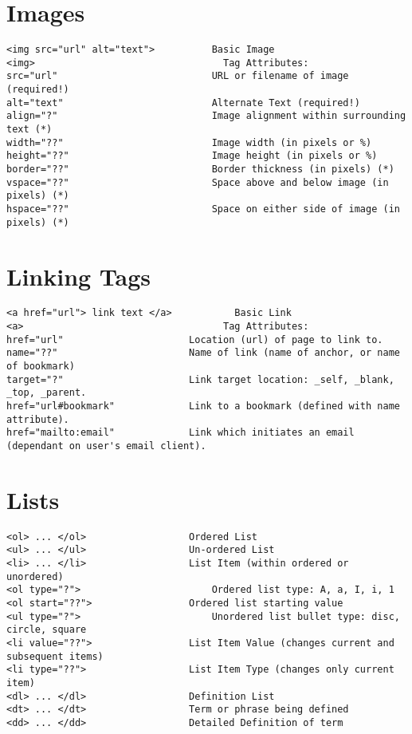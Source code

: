 \documentclass[11pt]{article}
\begin{document}
\section*{Images}
\label{sec:orgeabbfb8}
\begin{verbatim}
<img src="url" alt="text"> 	        Basic Image
<img>                                 Tag Attributes:	 
src="url"	                        URL or filename of image (required!)
alt="text"	                        Alternate Text (required!)
align="?"	                        Image alignment within surrounding text (*)
width="??"	                        Image width (in pixels or %)
height="??"	                        Image height (in pixels or %)
border="??"	                        Border thickness (in pixels) (*)
vspace="??"	                        Space above and below image (in pixels) (*)
hspace="??"	                        Space on either side of image (in pixels) (*)
\end{verbatim}
\section*{Linking Tags}
\label{sec:org6681346}
\begin{verbatim}
<a href="url"> link text </a>	        Basic Link
<a>                                   Tag Attributes:	 
href="url"		                Location (url) of page to link to.
name="??"		                Name of link (name of anchor, or name of bookmark)
target="?"		                Link target location: _self, _blank, _top, _parent.
href="url#bookmark"		        Link to a bookmark (defined with name attribute).
href="mailto:email"		        Link which initiates an email (dependant on user's email client).
\end{verbatim}
\section*{Lists}
\label{sec:orga93986d}
\begin{verbatim}
<ol> ... </ol>	                Ordered List
<ul> ... </ul>	                Un-ordered List
<li> ... </li>	                List Item (within ordered or unordered)
<ol type="?">		                Ordered list type: A, a, I, i, 1
<ol start="??">	                Ordered list starting value
<ul type="?">		                Unordered list bullet type: disc, circle, square
<li value="??">	                List Item Value (changes current and subsequent items)
<li type="??">	                List Item Type (changes only current item)
<dl> ... </dl>	                Definition List
<dt> ... </dt>	                Term or phrase being defined
<dd> ... </dd>	                Detailed Definition of term
\end{verbatim}
\end{document}
